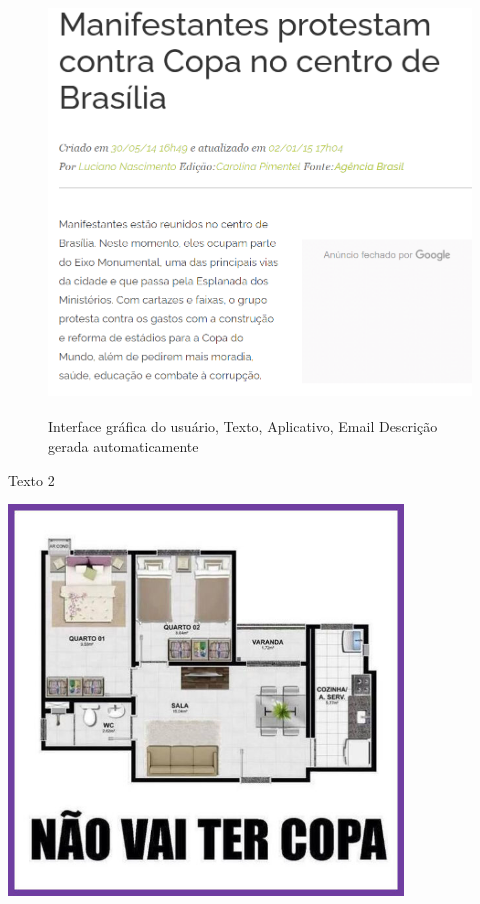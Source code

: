 \begin{figure}
\centering
\includegraphics[width=4.80833in,height=4.39331in]{./imgSAEB_6_POR/media/image47.png}
\caption{Interface gráfica do usuário, Texto, Aplicativo, Email
Descrição gerada automaticamente}
\end{figure}


Texto 2

\includegraphics[width=4.125in,height=4.08668in]{./imgSAEB_6_POR/media/image48.jpeg}

